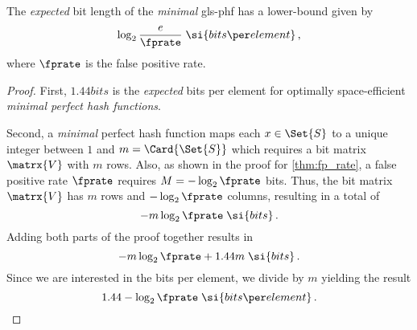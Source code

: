 \begin{corollary}
The \emph{expected} bit length of the \emph{minimal} \gls{gls-phf} has a lower-bound given by
\begin{equation}
\label{eq:mPHF_size}
    \log_2 \frac{e}{\fprate} \; \si{bits \per element}\,,
\end{equation}
where $\fprate$ is the false positive rate.
\end{corollary}
\begin{proof}
First, $1.44 \si{bits}$ is the \emph{expected} bits per element for optimally space-efficient \emph{minimal perfect hash functions}.

Second, a \emph{minimal} perfect hash function maps each $x \in \Set{S}$ to a unique integer between $1$ and $m=\Card{\Set{S}}$ which requires a bit matrix $\matrx{V}$ with $m$ rows. Also, as shown in the proof for \cref{thm:fp_rate}, a false positive rate $\fprate$ requires $M = -\log_2 \fprate$ bits. Thus, the bit matrix $\matrx{V}$ has $m$ rows and $-\log_2 \fprate$ columns, resulting in a total of
\begin{equation}
    -m \log_2 \fprate \; \si{bits}\,.
\end{equation}
Adding both parts of the proof together results in
\begin{equation}
    -m \log_2 \fprate + 1.44 m\; \si{bits}\,.
\end{equation}
Since we are interested in the bits per element, we divide by $m$ yielding the result
\begin{equation}
    1.44 - \log_2 \fprate\; \si{bits \per element}\,.
\end{equation}
\end{proof}


